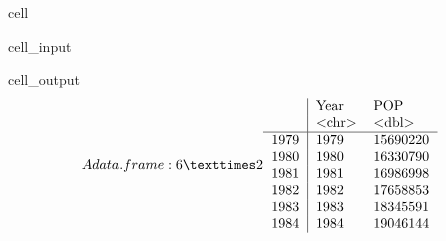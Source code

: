 \documentclass[letterpaper,10pt,english]{jupyterBook}
\begin{document}
\begin{sphinxuseclass}{cell}\begin{sphinxVerbatimInput}

\begin{sphinxuseclass}{cell_input}
\begin{sphinxVerbatim}[commandchars=\\\{\}]
\end{sphinxVerbatim}

\end{sphinxuseclass}\end{sphinxVerbatimInput}
\begin{sphinxVerbatimOutput}

\begin{sphinxuseclass}{cell_output}\begin{equation*}
\begin{split}A data.frame: 6 × 2
\begin{tabular}{r|ll}
  & Year & POP\\
  & <chr> & <dbl>\\
\hline
	1979 & 1979 & 15690220\\
	1980 & 1980 & 16330790\\
	1981 & 1981 & 16986998\\
	1982 & 1982 & 17658853\\
	1983 & 1983 & 18345591\\
	1984 & 1984 & 19046144\\
\end{tabular}\end{split}
\end{equation*}
\end{sphinxuseclass}\end{sphinxVerbatimOutput}

\end{sphinxuseclass}
\end{document}
